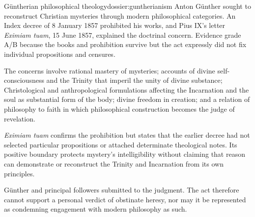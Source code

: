 \begin{heresydossier}{G\"untherian philosophical theology}{dossier:guntherianism}
\objectfield Anton G\"unther sought to reconstruct Christian mysteries through modern philosophical categories. An Index decree of 8 January 1857 prohibited his works, and Pius IX's letter \emph{Eximiam tuam}, 15 June 1857, explained the doctrinal concern. Evidence grade A/B because the books and prohibition survive but the act expressly did not fix individual propositions and censures.

\propositionfield The concerns involve rational mastery of mysteries; accounts of divine self-consciousness and the Trinity that imperil the unity of divine substance; Christological and anthropological formulations affecting the Incarnation and the soul as substantial form of the body; divine freedom in creation; and a relation of philosophy to faith in which philosophical construction becomes the judge of revelation.

\responsefield \emph{Eximiam tuam} confirms the prohibition but states that the earlier decree had not selected particular propositions or attached determinate theological notes. Its positive boundary protects mystery's intelligibility without claiming that reason can demonstrate or reconstruct the Trinity and Incarnation from its own principles.

\aftermathfield G\"unther and principal followers submitted to the judgment. The act therefore cannot support a personal verdict of obstinate heresy, nor may it be represented as condemning engagement with modern philosophy as such.
\end{heresydossier}

